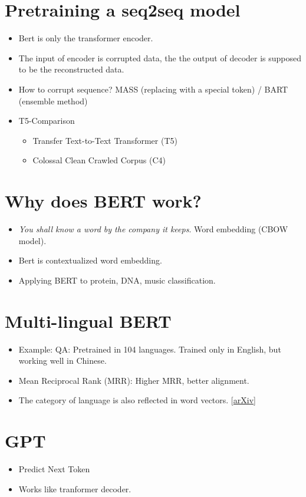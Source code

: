 \documentclass[11pt]{book}
\begin{document}
\section{Pretraining a seq2seq model}
\begin{itemize}
    \item Bert is only the transformer encoder.
    \item The input of encoder is corrupted data, the the output of decoder is supposed to be the reconstructed data.
    \item How to corrupt sequence? MASS (replacing with a special token) / BART (ensemble method)
    \item T5-Comparison
    \begin{itemize}
        \item Transfer Text-to-Text Transformer (T5)
        \item Colossal Clean Crawled Corpus (C4)
    \end{itemize}
\end{itemize}

\section{Why does BERT work?}
\begin{itemize}
    \item \textit{You shall know a word by the company it keeps}. Word embedding (CBOW model).
    \item Bert is contextualized word embedding.
    \item Applying BERT to protein, DNA, music classification.
\end{itemize}

\section{Multi-lingual BERT}
\begin{itemize}
    \item Example: QA: Pretrained in 104 languages. Trained only in English, but working well in Chinese.
    \item Mean Reciprocal Rank (MRR): Higher MRR, better alignment.
    \item The category of language is also reflected in word vectors. [\href{https://arxiv.org/abs/2010.10041}{arXiv}]
\end{itemize}

\section{GPT}
\begin{itemize}
    \item Predict Next Token
    \item Works like tranformer decoder.
\end{itemize}
\end{document}
